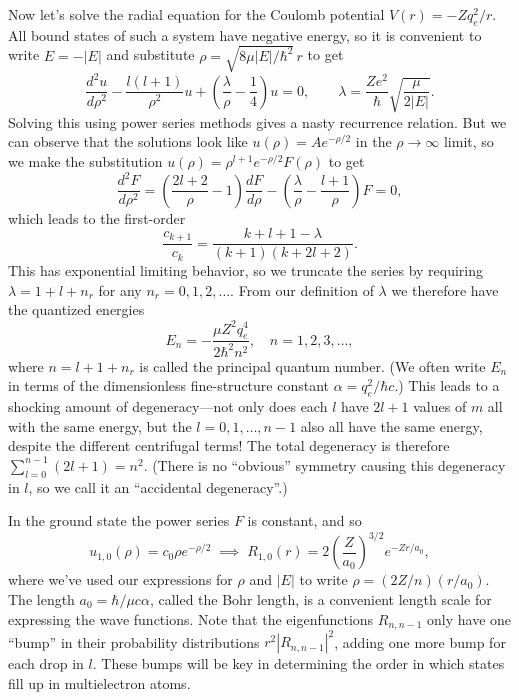 \documentclass[../p116main.tex]{subfiles}
\begin{document}
Now let's solve the radial equation for the Coulomb potential $V(r) = -Zq_e^2 / r$.
All bound states of such a system have negative energy, so it is convenient to write $E = -|E|$ and substitute $\rho = \sqrt{8\mu |E| / \hbar^2} \, r$ to get
\[ \frac{d^2u}{d\rho^2} - \frac{l(l+1)}{\rho^2} u + \left( \frac{\lambda}{\rho} - \frac{1}{4} \right) u = 0, \qquad \lambda = \frac{Ze^2}{\hbar} \sqrt{\frac{\mu}{2|E|}}. \]
Solving this using power series methods gives a nasty recurrence relation.
But we can observe that the solutions look like $u(\rho) = A e^{-\rho / 2}$ in the $\rho \to \infty$ limit, so we make the substitution $u(\rho) = \rho^{l+1} e^{-\rho / 2} F(\rho)$ to get
\[ \frac{d^2 F}{d\rho^2} = \left( \frac{2l+2}{\rho} - 1 \right) \frac{dF}{d\rho} - \left( \frac{\lambda}{\rho} - \frac{l+1}{\rho} \right) F = 0, \]
which leads to the first-order
\[ \frac{c_{k+1}}{c_k} = \frac{k + l + 1 - \lambda}{(k+1)(k + 2l + 2)}. \]
This has exponential limiting behavior, so we truncate the series by requiring $\lambda = 1 + l + n_r$ for any $n_r = 0, 1, 2, \ldots$.
From our definition of $\lambda$ we therefore have the quantized energies
\[ E_n = -\frac{\mu Z^2 q_e^{4}}{2\hbar^2 n^2}, \quad n = 1, 2, 3, \ldots, \]
where $n = l + 1 + n_r$ is called the principal quantum number.
(We often write $E_n$ in terms of the dimensionless fine-structure constant $\alpha = q_e^2 / \hbar c$.)
This leads to a shocking amount of degeneracy---not only does each $l$ have $2l+1$ values of $m$ all with the same energy, but the $l = 0, 1, \ldots, n-1$ also all have the same energy, despite the different centrifugal terms!
The total degeneracy is therefore $\sum_{l=0}^{n-1} (2l+1) = n^2$.
(There is no ``obvious'' symmetry causing this degeneracy in $l$, so we call it an ``accidental degeneracy''.)

In the ground state the power series $F$ is constant, and so    \vspace{-4pt}
\[ u_{1,0}(\rho) = c_0 \rho e^{-\rho / 2} \;\implies\; R_{1,0}(r) = 2 \left( \frac{Z}{a_0} \right)^{3 / 2} \! e^{-Zr / a_0}, \]
where we've used our expressions for $\rho$ and $|E|$ to write $\rho = (2Z / n) (r / a_0)$.
The length $a_0 = \hbar / \mu c \alpha$, called the Bohr length, is a convenient length scale for expressing the wave functions.
Note that the eigenfunctions $R_{n, n-1}$ only have one ``bump'' in their probability distributions $r^2 |R_{n,n-1}|^2$, adding one more bump for each drop in $l$.
These bumps will be key in determining the order in which states fill up in multielectron atoms.
\end{document}
